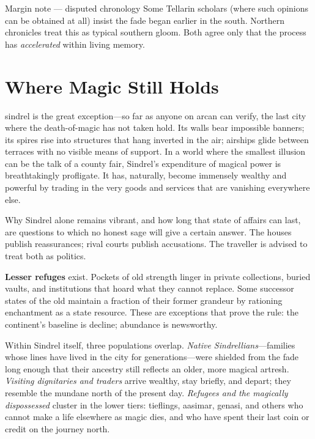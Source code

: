 \begin{DndComment}{Margin note --- disputed chronology}
  Some Tellarin scholars (where such opinions can be obtained at all) insist the fade began earlier in the south. Northern chronicles treat this as typical southern gloom. Both agree only that the process has \emph{accelerated} within living memory.
\end{DndComment}

\section{Where Magic Still Holds}

\Gls{sindrel} is the great exception---so far as anyone on \gls{arcan} can verify, the last city where the \gls{death-of-magic} has not taken hold. Its walls bear impossible banners; its spires rise into structures that hang inverted in the air; airships glide between terraces with no visible means of support. In a world where the smallest illusion can be the talk of a county fair, Sindrel's expenditure of magical power is breathtakingly profligate. It has, naturally, become immensely wealthy and powerful by trading in the very goods and services that are vanishing everywhere else.

Why Sindrel alone remains vibrant, and how long that state of affairs can last, are questions to which no honest sage will give a certain answer. The houses publish reassurances; rival courts publish accusations. The traveller is advised to treat both as politics.

\textbf{Lesser refuges} exist. Pockets of old strength linger in private collections, buried vaults, and institutions that hoard what they cannot replace. Some successor states of the old  maintain a fraction of their former grandeur by rationing enchantment as a state resource. These are exceptions that prove the rule: the continent's baseline is decline; abundance is newsworthy.

Within Sindrel itself, three populations overlap. \emph{Native Sindrellians}---families whose lines have lived in the city for generations---were shielded from the fade long enough that their ancestry still reflects an older, more magical \gls{artresh}. \emph{Visiting dignitaries and traders} arrive wealthy, stay briefly, and depart; they resemble the mundane north of the present day. \emph{Refugees and the magically dispossessed} cluster in the lower tiers: tieflings, aasimar, genasi, and others who cannot make a life elsewhere as magic dies, and who have spent their last coin or credit on the journey north.

